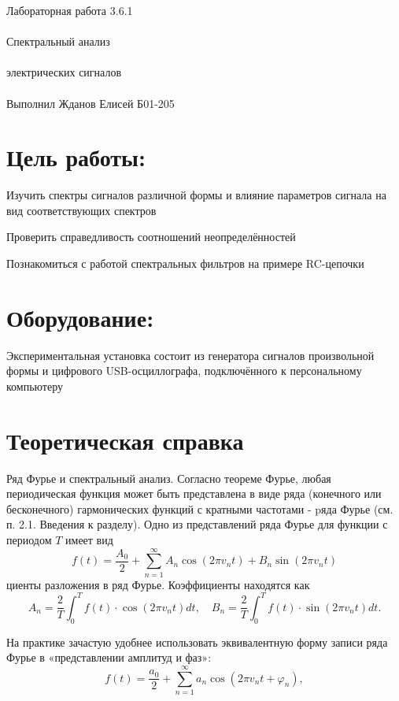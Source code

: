 \documentclass{astroedu-lab}
\begin{document}
\pagestyle{plain}

\begin{problem}{\huge Лабораторная работа 3.6.1\\\\Спектральный анализ\\\\электрических сигналов\\\\Выполнил Жданов Елисей Б01-205}

\section{Цель работы:}

Изучить спектры сигналов различной формы и влияние параметров сигнала на вид соответствующих спектров

Проверить справедливость соотношений неопределённостей

Познакомиться с работой спектральных фильтров на примере RC-цепочки

\section{Оборудование:}

Экспериментальная установка состоит из генератора сигналов произвольной формы и цифрового USB-осциллографа, подключённого к персональному компьютеру

\section{Теоретическая справка}

Ряд Фурье и спектральный анализ. Согласно теореме Фурье, любая периодическая функция может быть представлена в виде ряда (конечного или бесконечного) гармонических функций с кратными частотами - pяда Фурье (см. п. 2.1. Введения к разделу). Одно из представлений ряда Фурье для функции с периодом $T$ имеет вид
$$
f(t)=\frac{A_0}{2}+\sum_{n=1}^{\infty} A_n \cos \left(2 \pi v_n t\right)+B_n \sin \left(2 \pi v_n t\right)
$$
циенты разложения в ряд Фурье. Коэффициенты находятся как
$$
A_n=\frac{2}{T} \int_0^T f(t) \cdot \cos \left(2 \pi v_n t\right) d t, \quad B_n=\frac{2}{T} \int_0^T f(t) \cdot \sin \left(2 \pi v_n t\right) d t .
$$

На практике зачастую удобнее использовать эквивалентную форму записи ряда Фурье в «представлении амплитуд и фаз»:
$$
f(t)=\frac{a_0}{2}+\sum_{n=1}^{\infty} a_n \cos \left(2 \pi v_n t+\varphi_n\right),
$$


\end{problem}
\end{document}
